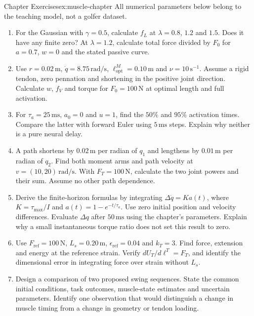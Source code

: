 \begin{exercises}{Chapter Exercises}{ex:muscle-chapter}
All numerical parameters below belong to the teaching model, not a golfer dataset.
\begin{enumerate}
\item For the Gaussian with $\gamma=0.5$, calculate $f_L$ at $\lambda=0.8$, $1.2$ and $1.5$. Does it have any finite zero? At $\lambda=1.2$, calculate total force divided by $F_0$ for $a=0.7$, $w=0$ and the stated passive curve.
\item Use $r=0.02\,\mathrm{m}$, $\dot q=8.75\,\mathrm{rad/s}$, $\ell^M_{\mathrm{opt}}=0.10\,\mathrm{m}$ and $\nu=10\,\mathrm{s^{-1}}$. Assume a rigid tendon, zero pennation and shortening in the positive joint direction. Calculate $w$, $f_V$ and torque for $F_0=100\,\mathrm{N}$ at optimal length and full activation.
\item For $\tau_a=25\,\mathrm{ms}$, $a_0=0$ and $u=1$, find the $50\%$ and $95\%$ activation times. Compare the latter with forward Euler using $5\,\mathrm{ms}$ steps. Explain why neither is a pure neural delay.
\item A path shortens by $0.02\,\mathrm{m}$ per radian of $q_1$ and lengthens by $0.01\,\mathrm{m}$ per radian of $q_2$. Find both moment arms and path velocity at $v=(10,20)\,\mathrm{rad/s}$. With $F_T=100\,\mathrm{N}$, calculate the two joint powers and their sum. Assume no other path dependence.
\item Derive the finite-horizon formulas by integrating $\Delta\ddot q=K a(t)$, where $K=\tau_{\max}/I$ and $a(t)=1-e^{-t/\tau_a}$. Use zero initial position and velocity differences. Evaluate $\Delta q$ after $50\,\mathrm{ms}$ using the chapter's parameters. Explain why a small instantaneous torque ratio does not set this result to zero.
\item Use $F_{\mathrm{ref}}=100\,\mathrm{N}$, $L_s=0.20\,\mathrm{m}$, $\epsilon_{\mathrm{ref}}=0.04$ and $k_T=3$. Find force, extension and energy at the reference strain. Verify $dU_T/d\ell^T=F_T$, and identify the dimensional error in integrating force over strain without $L_s$.
\item Design a comparison of two proposed swing sequences. State the common initial conditions, task outcomes, muscle-state estimates and uncertain parameters. Identify one observation that would distinguish a change in muscle timing from a change in geometry or tendon loading.
\end{enumerate}
\end{exercises}

